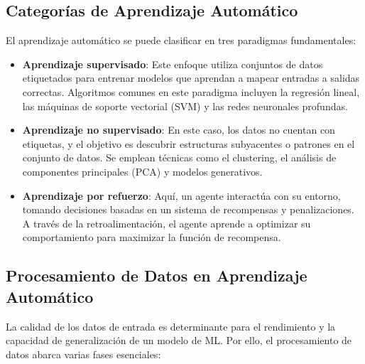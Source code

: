 \documentclass[11pt,spanish,listoffigures,listoftables]{tfgetsinf}
\begin{document}
\subsection{Categorías de Aprendizaje Automático}

El aprendizaje automático se puede clasificar en tres paradigmas fundamentales:

\begin{itemize}
    \item \textbf{Aprendizaje supervisado}: Este enfoque utiliza conjuntos de datos etiquetados para entrenar modelos que aprendan a mapear entradas a salidas correctas. Algoritmos comunes en este paradigma incluyen la regresión lineal, las máquinas de soporte vectorial (SVM) y las redes neuronales profundas. 
    
    \item \textbf{Aprendizaje no supervisado}: En este caso, los datos no cuentan con etiquetas, y el objetivo es descubrir estructuras subyacentes o patrones en el conjunto de datos. Se emplean técnicas como el clustering, el análisis de componentes principales (PCA) y modelos generativos.
    
    \item \textbf{Aprendizaje por refuerzo}: Aquí, un agente interactúa con su entorno, tomando decisiones basadas en un sistema de recompensas y penalizaciones. A través de la retroalimentación, el agente aprende a optimizar su comportamiento para maximizar la función de recompensa.
\end{itemize}

\subsection{Procesamiento de Datos en Aprendizaje Automático}

La calidad de los datos de entrada es determinante para el rendimiento y la capacidad de generalización de un modelo de ML. Por ello, el procesamiento de datos abarca varias fases esenciales:
\end{document}
